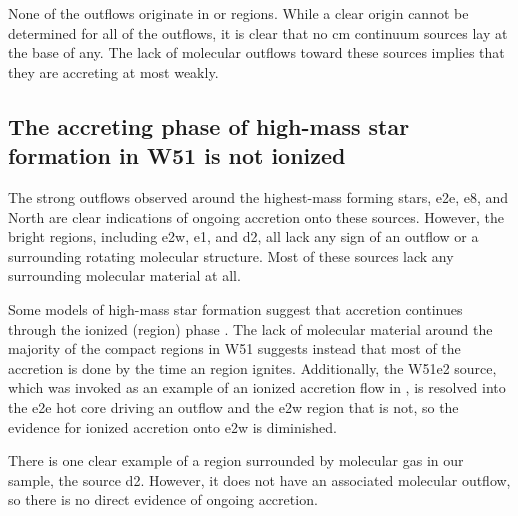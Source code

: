\documentclass{emulateapj}
\begin{document}
None of the outflows originate in \uchii or \hchii regions.  While a clear
origin cannot be determined for all of the outflows, it is clear that no cm
continuum sources lay at the base of any.  The lack of molecular outflows
toward these sources implies that they are accreting at most weakly.
% 

\subsection{The accreting phase of high-mass star formation in W51 is not ionized}
\label{sec:accretionandoutflows}
The strong outflows observed around the highest-mass forming stars, e2e, e8,
and North are clear indications of ongoing accretion onto these sources.
However, the bright \hii regions, including e2w, e1, and d2, all lack any sign
of an outflow or a surrounding rotating molecular structure.  Most of these
sources lack any surrounding molecular material at all.

Some models of high-mass star formation suggest that accretion continues
through the ionized (\hii region) phase \citep{Keto2002b,Keto2003a}.  The lack
of molecular material around the majority of the compact \hii regions in W51
suggests instead that most of the accretion is done by the time an \hii region
ignites.  Additionally, the W51e2 source, which was invoked as an example of an
ionized accretion flow in \citet{Keto2008a}, is  resolved into the e2e
hot core driving an outflow and the e2w \hchii region that is not, so the
evidence for ionized accretion onto e2w is diminished.

There is one clear example of a \hchii region surrounded by molecular gas in
our sample, the source d2.  However, it does not have an associated molecular
outflow, so there is no direct evidence of ongoing accretion.

% 
\end{document}
